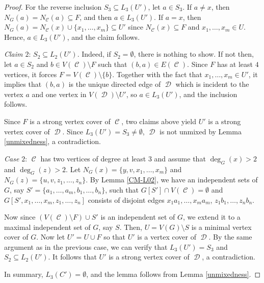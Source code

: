\documentclass[12pt, amscd]{amsart}
\theoremstyle{definition}
\DeclareMathOperator{\D}{\mathcal{D}}
\DeclareMathOperator{\C}{\mathcal{C}}
\newcommand{\0}{\bold{0}}
\begin{document}
\begin{proof}
For the reverse inclusion $S_3\subseteq L_3(U')$, let $a\in S_3$. If $a\ne x$, then $N_G(a) = N_{\C}(a) \subseteq F$, and then $a\in L_3(U')$. If $a = x$, then $N_{G}(a) =N_{\C}(x) \cup \{x_1,\ldots,x_m\} \subseteq U'$ since $N_{\C}(x)\subseteq F$ and $x_1,\ldots,x_m\in U$. Hence, $a\in L_3(U')$, and the claim follows.

{\it Claim $2$}: $S_2\subseteq L_2(U')$. Indeed, if  $S_2=\emptyset$, there is nothing to show. If not then, let $a\in S_2$  and $b\in V(\C)\setminus F$ such that $(b,a)\in E(\C)$. Since $F$ has at least $4$ vertices, it forces $F = V(\C)\setminus\{b\}$. Together with the fact that $x_1,\ldots,x_m\in U'$, it implies that $(b,a)$ is the unique directed edge of $\D$ which is incident to the vertex $a$ and one vertex in $V(\D) \setminus U'$,  so $a\in L_3(U')$, and the inclusion follows.
\medskip

Since $F$ is a strong vertex cover of $\C$, two claims above yield  $U'$ is a strong vertex cover of $\D$. Since $L_3(U') = S_3\ne \emptyset$, $\D$ is not unmixed by Lemma \ref{unmixedness}, a contradiction. 

\medskip

{\it Case $2$}: $\C$ has two vertices of degree at least $3$ and assume that $\deg_G(x) > 2$ and $\deg_G(z) > 2$. Let $N_G(x) = \{y,v,x_1,\ldots,x_m\}$ and $N_G(z) = \{u,v,z_1,\ldots,z_n\}$. By Lemma \ref{CM-L02}, we have an independent sets of $G$, say $S'=\{a_1,\ldots,a_m, b_1,\ldots,b_n\}$, such that $G[S'] \cap V(\C)=\emptyset$ and $G[S', x_1,\ldots,x_m,z_1,\ldots,z_n]$ consists of disjoint edges $x_1a_1,\ldots,x_ma_m$, $z_1b_1,\ldots,z_nb_n$.

Now since $(V(\C)\setminus F)\cup S'$ is an independent set of $G$, we  extend it to a maximal independent set of $G$, say $S$. Then, $U = V(G)\setminus S$ is a minimal vertex cover of $G$. Now let $U' = U \cup F$ so that $U'$ is a vertex cover of $\D$. By the same argument as in the previous case, we can verify that $L_3(U') = S_3$ and $S_2\subseteq L_2(U')$. It follows that $U'$ is a strong vertex cover of $\D$, a contradiction.

In summary, $L_3(C') = \emptyset$, and the lemma follows from Lemma \ref{unmixedness}.
\end{proof}
\end{document}
